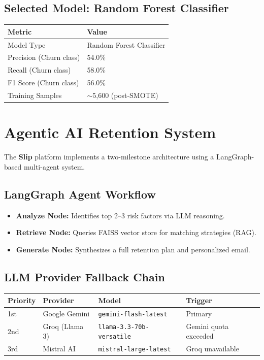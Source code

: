 \documentclass[11pt,a4paper]{article}
\begin{document}
\subsection{Selected Model: Random Forest Classifier}

\begin{table}[h!]
\centering
\begin{tabularx}{\textwidth}{l X}
\toprule
\textbf{Metric} & \textbf{Value} \\
\midrule
Model Type & Random Forest Classifier \\
Precision (Churn class) & 54.0\% \\
Recall (Churn class) & 58.0\% \\
F1 Score (Churn class) & 56.0\% \\
Training Samples & $\sim$5,600 (post-SMOTE) \\
\bottomrule
\end{tabularx}
\end{table}

\newpage

\section{Agentic AI Retention System}

The \textbf{Slip} platform implements a two-milestone architecture using a LangGraph-based multi-agent system.

\subsection{LangGraph Agent Workflow}
\begin{itemize}
    \item \textbf{Analyze Node:} Identifies top 2–3 risk factors via LLM reasoning.
    \item \textbf{Retrieve Node:} Queries FAISS vector store for matching strategies (RAG).
    \item \textbf{Generate Node:} Synthesizes a full retention plan and personalized email.
\end{itemize}

\subsection{LLM Provider Fallback Chain}

\begin{table}[h!]
\centering
\begin{tabular}{l l l l}
\toprule
\textbf{Priority} & \textbf{Provider} & \textbf{Model} & \textbf{Trigger} \\
\midrule
1st & Google Gemini & \texttt{gemini-flash-latest} & Primary \\
2nd & Groq (Llama 3) & \texttt{llama-3.3-70b-versatile} & Gemini quota exceeded \\
3rd & Mistral AI & \texttt{mistral-large-latest} & Groq unavailable \\
\bottomrule
\end{tabular}
\end{table}
\end{document}
